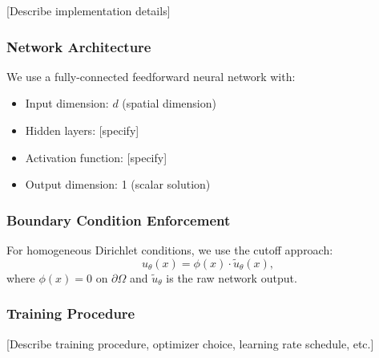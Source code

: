 [Describe implementation details]

\subsubsection{Network Architecture}

We use a fully-connected feedforward neural network with:
\begin{itemize}
    \item Input dimension: $d$ (spatial dimension)
    \item Hidden layers: [specify]
    \item Activation function: [specify]
    \item Output dimension: 1 (scalar solution)
\end{itemize}

\subsubsection{Boundary Condition Enforcement}

For homogeneous Dirichlet conditions, we use the cutoff approach:
\begin{equation}
    u_\theta(x) = \phi(x) \cdot \tilde{u}_\theta(x),
\end{equation}
where $\phi(x) = 0$ on $\partial\Omega$ and $\tilde{u}_\theta$ is the raw network output.

\subsubsection{Training Procedure}

[Describe training procedure, optimizer choice, learning rate schedule, etc.]
